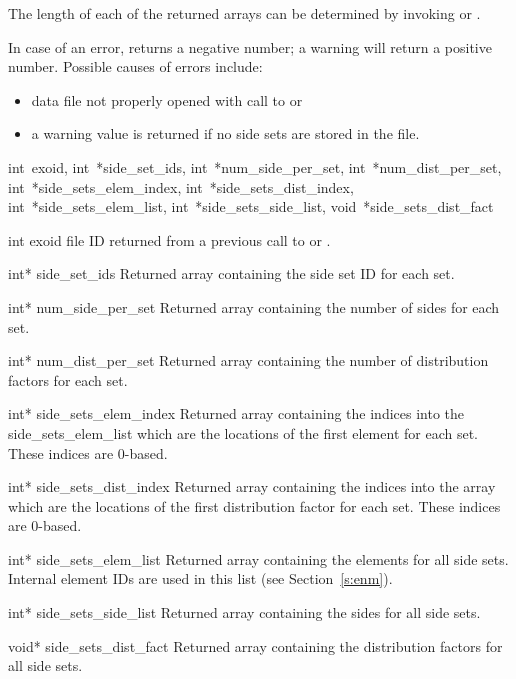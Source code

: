 The length of each of the returned arrays can be determined by
invoking  or .


In case of an error,  returns a
negative number; a warning will return a positive number. Possible
causes of errors include:
\begin{itemize}
 \item data file not properly opened with call to 
 or 

 \item a warning value is returned if no side sets are stored in the
 file.
\end{itemize}

{int~exoid,
int~*side_set_ids,
int~*num_side_per_set,
int~*num_dist_per_set,
int~*side_sets_elem_index,
int~*side_sets_dist_index,
int~*side_sets_elem_list,
int~*side_sets_side_list,
void~*side_sets_dist_fact}

\begin{parameters}
\item[{int exoid \R{}}]
\exo{} file ID returned from a previous call to 
or .

\item[{int* side_set_ids \W{}}]
Returned array containing the side set ID for each set.

\item[{int* num_side_per_set \W{}}]
Returned array containing the number of sides for each set.

\item[{int* num_dist_per_set \W{}}]
Returned array containing the number of distribution factors
for each set.

\item[{int* side_sets_elem_index \W{}}]
Returned array containing the indices into the
{side_sets_elem_list} which are the locations of the first element
for each set. These indices are 0-based.

\item[{int* side_sets_dist_index \W{}}]
Returned array containing the indices into the 
array which are the locations of the first distribution factor
for each set. These indices are 0-based.

\item[{int* side_sets_elem_list \W{}}]
Returned array containing the elements for all side sets.
Internal element IDs are used in this list (see  Section~\ref{s:enm}).

\item[{int* side_sets_side_list \W{}}]
Returned array containing the sides for all side sets.

\item[{void* side_sets_dist_fact \W{}}]
Returned array containing the distribution factors for all
side sets.
\end{parameters}

